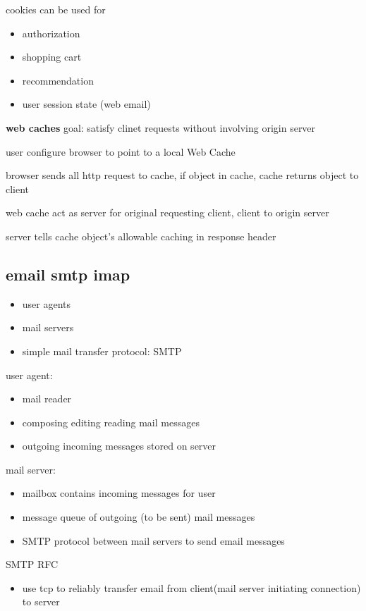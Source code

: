 \documentclass[10pt]{article}
\theoremstyle{break}
\begin{document}
cookies can be used for 
\begin{itemize}
    \item authorization 
    \item shopping cart 
    \item recommendation
    \item user session state (web email)
\end{itemize}

\textbf{web caches}
goal: satisfy clinet requests without involving origin server 

user configure browser to point to a local Web Cache 

browser sends all http request to cache, if object in cache, cache returns object to client

web cache act as server for original requesting client, client to origin server 

server tells cache object's allowable caching in response header 
\subsection{email smtp imap}
\begin{itemize}
    \item user agents 
    \item mail servers 
    \item simple mail transfer protocol: SMTP 
\end{itemize}
user agent:
\begin{itemize}
    \item  mail reader 
    \item  composing editing reading mail messages 
    \item outgoing incoming messages stored on server 
\end{itemize}

mail server: 

\begin{itemize}
    \item  mailbox contains incoming messages for user 
    \item  message queue of outgoing (to be sent) mail messages 
    \item  SMTP protocol between mail servers to send email messages 
\end{itemize}

SMTP RFC 
\begin{itemize}
    \item use tcp to reliably transfer email from client(mail server initiating connection) to server 
\end{itemize}
\end{document}

